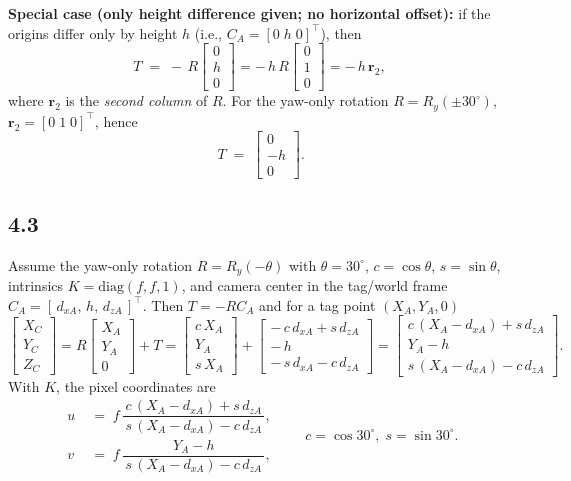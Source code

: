 \documentclass[12pt]{article}
\begin{document}
\textbf{Special case (only height difference given; no horizontal offset):}
if the origins differ only by height \(h\) (i.e., \(C_A=[0\; h\; 0]^\top\)), then
\[
T \;=\; -\,R\begin{bmatrix}0\\ h\\ 0\end{bmatrix}
= -\,h\,R\begin{bmatrix}0\\ 1\\ 0\end{bmatrix}
= -\,h\,\boldsymbol{r}_2,
\]
where \(\boldsymbol{r}_2\) is the \emph{second column} of \(R\).
For the yaw-only rotation \(R=R_y(\pm 30^\circ)\), \(\boldsymbol{r}_2=[0\;1\;0]^\top\), hence
\[
\boxed{\,T \;=\; \begin{bmatrix}0\\ -h\\ 0\end{bmatrix}.}
\]

\subsection*{4.3 }
Assume the yaw-only rotation \(R=R_y(-\theta)\) with \(\theta=30^\circ\),
\(c=\cos\theta\), \(s=\sin\theta\), intrinsics \(K=\mathrm{diag}(f,f,1)\),
and camera center in the tag/world frame
\(C_A=[\,d_{xA},\,h,\,d_{zA}\,]^\top\).
Then \(T=-RC_A\) and for a tag point \((X_A,Y_A,0)\)
\[
\begin{bmatrix}X_C\\Y_C\\Z_C\end{bmatrix}
= R\!\begin{bmatrix}X_A\\Y_A\\0\end{bmatrix} + T
=
\begin{bmatrix}
c\,X_A \\[2pt]
Y_A \\[2pt]
s\,X_A
\end{bmatrix}
+
\begin{bmatrix}
-\,c\,d_{xA}+s\,d_{zA}\\[2pt]
-\,h\\[2pt]
-\,s\,d_{xA}-c\,d_{zA}
\end{bmatrix}
=
\begin{bmatrix}
c\,(X_A-d_{xA}) + s\,d_{zA}\\[2pt]
Y_A - h\\[2pt]
s\,(X_A-d_{xA}) - c\,d_{zA}
\end{bmatrix}.
\]
With \(K\), the pixel coordinates are
\[
\boxed{
\begin{aligned}
u \; &=\; f\,\dfrac{\,c\,(X_A-d_{xA}) + s\,d_{zA}\,}{\,s\,(X_A-d_{xA}) - c\,d_{zA}\,},\\[8pt]
v \; &=\; f\,\dfrac{\,Y_A - h\,}{\,s\,(X_A-d_{xA}) - c\,d_{zA}\,},
\end{aligned}}
\qquad c=\cos 30^\circ,\; s=\sin 30^\circ.
\]
\end{document}
